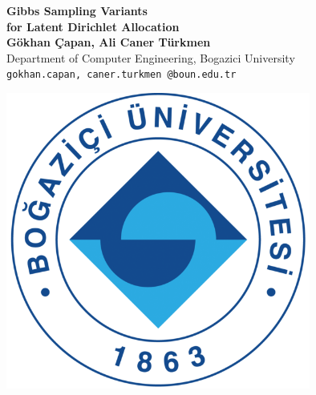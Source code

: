 \documentclass[a0,portrait]{a0poster}
\begin{document}


\begin{minipage}[b]{0.75\linewidth}
\veryHuge  \textbf{Gibbs Sampling Variants \\for Latent Dirichlet Allocation} \color{Black}\\ %

\huge \textbf{G\"okhan \c Capan, Ali Caner T\" urkmen}\\[0.5cm] %
\Large Department of Computer Engineering, Bogazici University\\[0.4cm] %
\Large \texttt{gokhan.capan, caner.turkmen @boun.edu.tr} \\
\end{minipage}
%
\begin{minipage}[b]{0.25\linewidth}
\includegraphics[width=10cm]{logo.png}\\
\end{minipage}

\vspace{1cm} %
\end{document}
